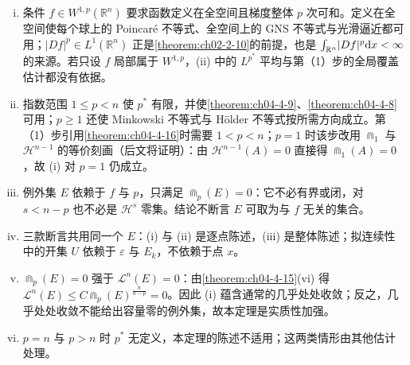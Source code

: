 \documentclass[../../main.tex]{subfiles}%
\begin{document}
\begin{remark}\label{remark:ch04-thm-4-19-条件}
\begin{enumerate}[(i)]
\item 条件 $f\in W^{1,p}(\mathbb{R}^n)$ 要求函数定义在全空间且梯度整体 $p$ 次可和。定义在全空间使每个球上的 Poincaré 不等式、全空间上的 GNS 不等式与光滑逼近都可用；$\lvert Df\rvert^p\in L^1(\mathbb{R}^n)$ 正是\cref{theorem:ch02-2-10}的前提，也是 $\int_{\mathbb{R}^n}\lvert Df\rvert^p\mathrm{d} x<\infty$ 的来源。若只设 $f$ 局部属于 $W^{1,p}$，(ii) 中的 $L^{p^*}$ 平均与第（1）步的全局覆盖估计都没有依据。%
\item 指数范围 $1\leqslant p<n$ 使 $p^*$ 有限，并使\cref{theorem:ch04-4-9}、\cref{theorem:ch04-4-8}可用；$p\geqslant1$ 还使 Minkowski 不等式与 Hölder 不等式按所需方向成立。第（1）步引用\cref{theorem:ch04-4-16}时需要 $1<p<n$；$p=1$ 时该步改用 $\Cap_1$ 与 $\mathcal{H}^{n-1}$ 的等价刻画（后文将证明）：由 $\mathcal{H}^{n-1}(A)=0$ 直接得 $\Cap_1(A)=0$，故 (i) 对 $p=1$ 仍成立。%
\item 例外集 $E$ 依赖于 $f$ 与 $p$，只满足 $\Cap_p(E)=0$：它不必有界或闭，对 $s<n-p$ 也不必是 $\mathcal{H}^s$ 零集。结论不断言 $E$ 可取为与 $f$ 无关的集合。
\item 三款断言共用同一个 $E$：(i) 与 (ii) 是逐点陈述，(iii) 是整体陈述；拟连续性中的开集 $U$ 依赖于 $\varepsilon$ 与 $E_k$，不依赖于点 $x$。
\item $\Cap_p(E)=0$ 强于 $\mathcal{L}^n(E)=0$：由\cref{theorem:ch04-4-15}(vi) 得 $\mathcal{L}^n(E)\leqslant C\Cap_p(E)^{\frac{n}{n-p}}=0$。因此 (i) 蕴含通常的几乎处处收敛；反之，几乎处处收敛不能给出容量零的例外集，故本定理是实质性加强。%
\item $p=n$ 与 $p>n$ 时 $p^*$ 无定义，本定理的陈述不适用；这两类情形由其他估计处理。
\end{enumerate}
\end{remark}
\end{document}
